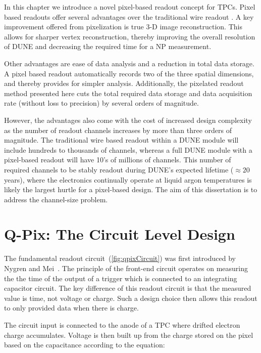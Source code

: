 In this chapter we introduce a novel pixel-based readout concept for TPCs.
Pixel based readouts offer several advantages over the traditional wire readout \citep{lartpc_recon_problems_joshi_2015}.
A key improvement offered from pixelization is true 3-D image reconstruction.
This allows for sharper vertex reconstruction, thereby improving the overall resolution of DUNE and decreasing the required time for a NP measurement.

Other advantages are ease of data analysis and a reduction in total data storage.
A pixel based readout automatically records two of the three spatial dimensions, and thereby provides for simpler analysis.
Additionally, the pixelated readout method presented here cuts the total required data storage and data acquisition rate (without loss to precision) by several orders of magnitude.

However, the advantages also come with the cost of increased design complexity as the number of readout channels increases by more than three orders of magnitude. 
The traditional wire based readout within a DUNE module will include hundreds to thousands of channels, whereas a full DUNE module with a pixel-based readout will have 10's of millions of channels.
This number of required channels to be stably readout during DUNE's expected lifetime ($\approx 20$ years), where the electronics continually operate at liquid argon temperatures is likely the largest hurtle for a pixel-based design.
The aim of this dissertation is to address the channel-size problem.

\section{Q-Pix: The Circuit Level Design}

The fundamental readout circuit~(\ref{fig:qpixCircuit}) was first introduced by Nygren and Mei~\citep{qpix:nygren:mei}.
The principle of the front-end circuit operates on measuring the the time of the output of a trigger which is connected to an integrating capacitor circuit.
The key difference of this readout circuit is that the measured value is time, not voltage or charge.
Such a design choice then allows this readout to only provided data when there is charge.

The circuit input is connected to the anode of a TPC where drifted electron charge accumulates.
Voltage is then built up from the charge stored on the pixel based on the capacitance according to the equation:

